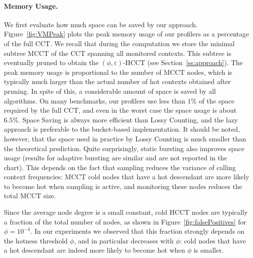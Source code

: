 \documentclass[preprint]{sigplanconf}
\begin{document}
\paragraph{Memory Usage.} We first evaluate how much space can be saved by our approach. Figure~\ref{fig:VMPeak} plots the peak memory usage of our profilers as a percentage of the full CCT. We recall that during  the computation we store the minimal subtree MCCT of the CCT spanning all monitored contexts. This subtree is eventually pruned to obtain the $(\phi,\varepsilon)$-HCCT (see Section~\ref{ss:approach}). The peak memory usage is proportional to the number of MCCT nodes, which is typically much larger than the actual number of hot contexts obtained after pruning. 
In spite of this, a considerable amount of space is saved by all algorithms. On many benchmarks, our profilers use less than $1\%$ of the space required by the full CCT, and even in the worst case the space usage is about $6.5\%$. Space Saving is always more efficient than Lossy Counting, and the lazy approach is preferable to the bucket-based implementation. It should be noted, however, that the space used in practice by Lossy Counting is much smaller than the theoretical prediction. Quite surprisingly, static bursting also improves space usage (results for adaptive bursting are similar and are not reported in the chart). This depends on the fact that sampling reduces the variance of calling context frequencies: MCCT cold nodes that have a hot descendant are more likely to become hot when sampling is active, and monitoring these nodes reduces the total MCCT size.

Since the average node degree is a small constant,  cold HCCT nodes are typically a fraction of the total number of nodes, as shown in Figure~\ref{fig:falsePositives} for $\phi=10^{-4}$. In our experiments we observed that this fraction strongly depends on the  hotness threshold $\phi$, and in particular decreases with $\phi$: cold nodes that have a hot descendant are indeed more likely to become hot when $\phi$ is smaller.
\end{document}
